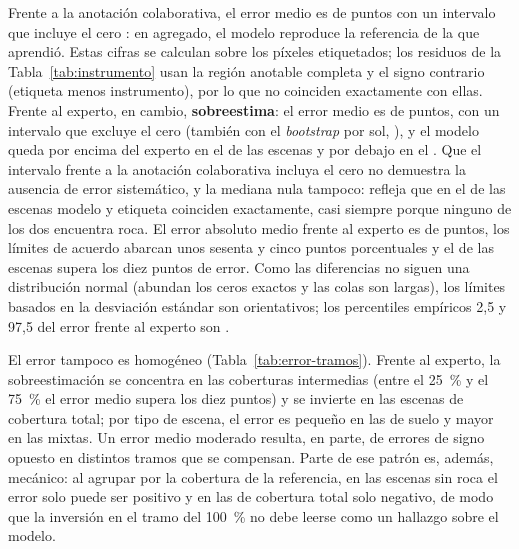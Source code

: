 Frente a la anotación colaborativa, el error medio es de \cBAColMedia{} puntos con un intervalo
que incluye el cero \cBAColMediaIC: en agregado, el modelo reproduce la referencia de la que
aprendió. Estas cifras se calculan sobre los píxeles etiquetados; los residuos de la
Tabla~\ref{tab:instrumento} usan la región anotable completa y el signo contrario (etiqueta
menos instrumento), por lo que no coinciden exactamente con ellas. Frente al experto, en cambio, \textbf{sobreestima}: el error medio es de
\cBAExpMedia{} puntos, con un intervalo que excluye el cero \cBAExpMediaIC{} (también con el
\textit{bootstrap} por sol, \cTempBAIC), y el modelo queda por encima del experto en el
\cBAExpEncima{} de las escenas y por debajo en el \cBAExpDebajo. Que el intervalo frente a la anotación
colaborativa incluya el cero no demuestra la ausencia de error sistemático, y la mediana nula
tampoco: refleja que en el \cExpExactas{}
de las escenas modelo y etiqueta coinciden exactamente, casi siempre porque ninguno de los dos
encuentra roca. El error absoluto medio frente al experto es de \cBAExpMAE{} puntos, los límites
de acuerdo abarcan unos sesenta y cinco puntos porcentuales y el \cBAExpDiez{} de las escenas
supera los diez puntos de error. Como las diferencias no siguen una distribución normal (abundan
los ceros exactos y las colas son largas), los límites basados en la desviación estándar son
orientativos; los percentiles empíricos 2,5 y 97,5 del error frente al experto son
\cBAExpPct.

El error tampoco es homogéneo (Tabla~\ref{tab:error-tramos}). Frente al experto, la
sobreestimación se concentra en las coberturas intermedias (entre el \SI{25}{\percent} y el
\SI{75}{\percent} el error medio supera los diez puntos) y se invierte en las escenas de
cobertura total; por tipo de escena, el error es pequeño en las de suelo y mayor en las mixtas.
Un error medio moderado resulta, en parte, de errores de signo opuesto en distintos tramos que
se compensan. Parte de ese patrón es, además, mecánico: al agrupar por la cobertura de la
referencia, en las escenas sin roca el error solo puede ser positivo y en las de cobertura total
solo negativo, de modo que la inversión en el tramo del \SI{100}{\percent} no debe leerse como un
hallazgo sobre el modelo.

\begin{table}[htbp]
  \centering
  \small
  \caption[Error del modelo por tramo de cobertura y tipo de escena]{Error de la cobertura
    del modelo por tramo de cobertura de la referencia y por tipo de escena: número de
    escenas, error medio con signo y error absoluto medio, en puntos porcentuales.}
  \label{tab:error-tramos}
  
\end{table}

